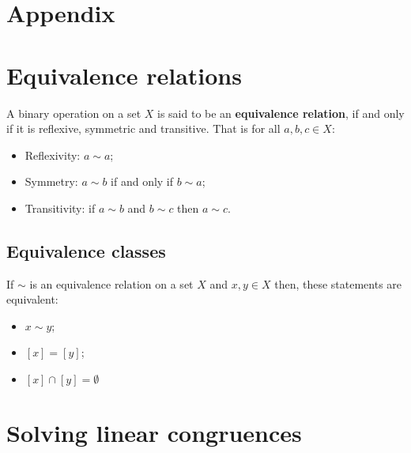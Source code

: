 \documentclass[12pt, a4paper]{article}
\begin{document}








\pagebreak

\appendix

\section*{Appendix}

\section{Equivalence relations}

\begin{definition}
    A binary operation on a set \(X\) is said to be an \textbf{equivalence relation}, if and only if it is reflexive, symmetric and transitive. That is for all \(a,b,c \in X\):
    \begin{itemize}
        \item Reflexivity: \(a \sim a\);
        \item Symmetry: \(a \sim b\) if and only if \(b\sim a\);
        \item Transitivity: if \(a\sim b\) and \(b\sim c\) then \(a\sim c\).
    \end{itemize}
\end{definition}

\subsection{Equivalence classes}

\begin{theorem}
    If \(\sim\) is an equivalence relation on a set \(X\) and \(x,y\in X\) then, these statements are equivalent:
    \begin{itemize}
        \item \(x\sim y\);
        \item \([x]=[y]\);
        \item \([x]\cap [y] =\emptyset\)
    \end{itemize}
\end{theorem}

\section{Solving linear congruences}
\end{document}
